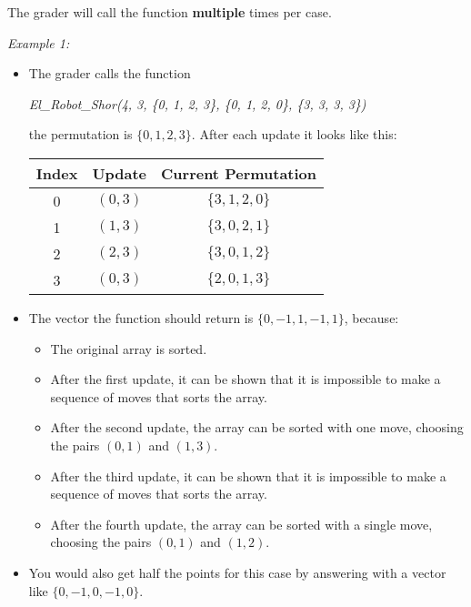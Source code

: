 \documentclass[12pt]{scrartcl}
\begin{document}
    The grader will call the function \textbf{multiple} times per case.
    

        {\itshape Example 1:}
        \begin{itemize}
            \item The grader calls the function 
            \begin{center}
                \textit{El\_Robot\_Shor(4, 3, \{0, 1, 2, 3\}, \{0, 1, 2, 0\}, \{3, 3, 3, 3\})}
            \end{center}
            
            the permutation is $\{0, 1, 2, 3\}$. After each update it looks like this:
            \begin{center}
                \begin{tabular}{|c|c|c|}
                    \hline
                    Index & Update & Current Permutation \\
                    \hline
                    \hline
                     0 & $(0, 3)$ &  $\{3, 1, 2, 0\}$ \\
                     \hline
                     1 & $(1, 3)$ & $\{3, 0, 2, 1\}$ \\
                     \hline
                     2 & $(2, 3)$ & $\{3, 0, 1, 2\}$ \\
                     \hline
                     3 & $(0, 3)$ & $\{2, 0, 1, 3\}$ \\
                     \hline
                \end{tabular}
            \end{center}
            \item The vector the function should return is $\{0, -1, 1 , -1, 1\}$, because:
            \begin{itemize}
                \item  The original array is sorted.
                \item  After the first update, it can be shown that it is impossible to make a sequence of moves that sorts the array.
                \item After the second update, the array can be sorted with one move, choosing the pairs $(0, 1)$ and $(1, 3)$.
                \item  After the third update, it can be shown that it is impossible to make a sequence of moves that sorts the array.
                \item After the fourth update, the array can be sorted with a single move, choosing the pairs $(0, 1)$ and $(1, 2)$.
            \end{itemize}
            \item You would also get half the points for this case by answering with a vector like $\{0, -1, 0, -1, 0\}$.
        \end{itemize}
        
\end{document}
